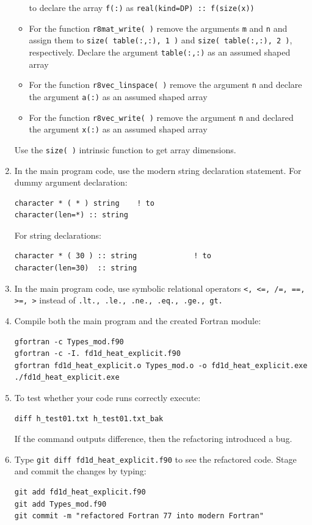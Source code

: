 \documentclass[12pt]{article}
\begin{document}
\begin{enumerate}
\begin{itemize}
to declare the array \texttt{f(:)} as \texttt{real(kind=DP) :: f(size(x))}
\item For the function \texttt{r8mat\_write( )} remove the arguments \texttt{m} and \texttt{n} and assign them
to \texttt{size( table(:,:), 1 )} and \texttt{size( table(:,:), 2 )}, respectively. Declare the argument \texttt{table(:,:)}
as an assumed shaped array
\item For the function \texttt{r8vec\_linspace( )} remove the argument \texttt{n} and declare the argument \texttt{a(:)} as
an assumed shaped array
\item For the function \texttt{r8vec\_write( )} remove the argument \texttt{n} and declared the argument \texttt{x(:)} as
an assumed shaped array
\end{itemize}
Use the \texttt{size( )} intrinsic function to get array dimensions. 
\item In the main program code, use the modern string declaration statement. For dummy argument
declaration:
\begin{verbatim}
character * ( * ) string    ! to
character(len=*) :: string
\end{verbatim}
For string declarations:
\begin{verbatim}
character * ( 30 ) :: string             ! to
character(len=30)  :: string
\end{verbatim}
\item In the main program code, use symbolic relational operators \texttt{<, <=, /=, ==, >=, >}
instead of \texttt{.lt., .le., .ne., .eq., .ge., gt.}
\item Compile both the main program and the created Fortran module:
\begin{verbatim}
gfortran -c Types_mod.f90
gfortran -c -I. fd1d_heat_explicit.f90
gfortran fd1d_heat_explicit.o Types_mod.o -o fd1d_heat_explicit.exe
./fd1d_heat_explicit.exe
\end{verbatim}
\item To test whether your code runs correctly execute:
\begin{verbatim}
diff h_test01.txt h_test01.txt_bak
\end{verbatim}
If the command outputs difference, then the refactoring introduced a bug.
\item Type \texttt{git diff fd1d\_heat\_explicit.f90} to see the refactored code. Stage and commit
the changes by typing: 
\begin{verbatim}
git add fd1d_heat_explicit.f90
git add Types_mod.f90
git commit -m "refactored Fortran 77 into modern Fortran"

\end{verbatim}
\end{enumerate}
\end{document}
